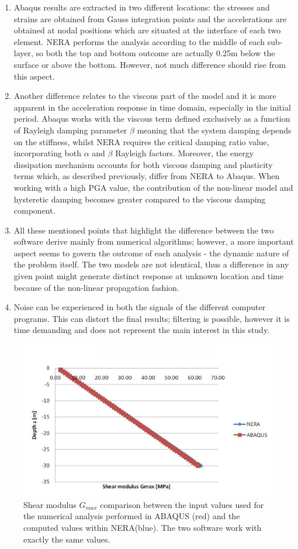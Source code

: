 \begin{enumerate}
		\item Abaqus results are extracted in two different locations: the stresses and strains are obtained from Gauss integration points and the accelerations are obtained at nodal positions which are situated at the interface of each two element. NERA performs the analysis according to the middle of each sub-layer, so both the top and bottom outcome are actually 0.25m below the surface or above the bottom. However, not much difference should rise from this aspect.
		\item Another difference relates to the viscous part of the model and it is more apparent in the acceleration response in time domain, especially in the initial period. Abaqus works with the viscous term defined exclusively as a function of Rayleigh damping parameter $\beta$ meaning that the system damping depends on the stiffness, whilst NERA requires the critical damping ratio value, incorporating both $\alpha$ and $\beta$ Rayleigh factors. Moreover, the energy dissipation mechanism accounts for both viscous damping and plasticity terms which, as described previously, differ from NERA to Abaqus. When working with a high PGA value, the contribution of the non-linear model and hysteretic damping becomes greater compared to the viscous damping component.
		\item All these mentioned points that highlight the difference between the two software derive mainly from numerical algorithms; however, a more important aspect seems to govern the outcome of each analysis - the dynamic nature of the problem itself. The two models are not identical, thus a difference in any given point might generate distinct response at unknown location and time because of the non-linear propagation fashion. 
		\item Noise can be experienced in both the signals of the different computer programs. This can distort the final results; filtering is possible, however it is time demanding and does not represent the main interest in this study.
	\end{enumerate}
			\begin{figure}[h!]
				\centering
				\includegraphics[width=0.5\linewidth]{"shear"}
				\caption{Shear modulus $G_{max}$ comparison between the input values used for the numerical analysis performed in ABAQUS (red) and the computed values within NERA(blue). The two software work with exactly the same values.}
				\label{shear1}
			\end{figure}
	
